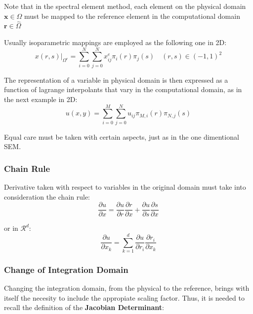 \documentclass[
  a4paper,
  10pt]{article}
\begin{document}
Note that in the spectral element method, each element on the physical
domain \(\textbf{x} \in \Omega\) must be mapped to the reference element
in the computational domain \(\textbf{r} \in \hat{\Omega}\)

Usually isoparametric mappings are employed as the following one in 2D:
\begin{equation}
\left.x(r,s)\right\rvert_{\Omega^{e}}=\sum_{i=0}^{N}\sum_{j=0}^{N} x_{ij}^{e} \pi_{i}(r) \pi_{j}(s) \quad (r,s) \in (-1,1)^{2}
\end{equation}

The representation of a variable in physical domain is then expressed as
a function of lagrange interpolants that vary in the computational
domain, as in the next example in 2D: \begin{equation}
    u(x,y)=\sum_{i=0}^{M}\sum_{j=0}^{N} u_{ij} \pi_{M,i}(r) \pi_{N,j}(s) 
\end{equation}

Equal care must be taken with certain aspects, just as in the one
dimentional SEM.

\hypertarget{chain-rule-1}{%
\subsubsection{Chain Rule}\label{chain-rule-1}}

Derivative taken with respect to variables in the original domain must
take into consideration the chain rule: \begin{equation}
    \frac{\partial u}{\partial x}=\frac{\partial u}{\partial r}\frac{\partial r}{\partial x}+\frac{\partial u}{\partial s}\frac{\partial s}{\partial x} 
\end{equation}

or in \(\mathcal{R}^{d}\): \begin{equation}
    \frac{\partial u}{\partial x_k}=\sum_{k=1}^{d}\frac{\partial u}{\partial r_i}\frac{\partial r_i}{\partial x_k}
\end{equation}

\hypertarget{change-of-integration-domain-1}{%
\subsubsection{Change of Integration
Domain}\label{change-of-integration-domain-1}}

Changing the integration domain, from the physical to the reference,
brings with itself the necesity to include the appropiate scaling
factor. Thus, it is needed to recall the definition of the
\textbf{Jacobian Determinant}:
\end{document}
